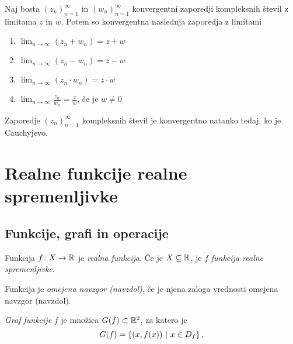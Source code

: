 \documentclass[12pt, a4paper]{article}
\begin{document}
\obvs

\begin{posledica}
Naj bosta $(z_n)_{n=1}^\infty$ in $(w_n)_{n=1}^\infty$ konvergentni zaporedji kompleksnih števil z limitama $z$ in $w$. Potem so konvergentna naslednja zaporedja z limitami

\begin{enumerate}[label=\arabic*)]
\item $\displaystyle\lim_{n\to\infty}(z_n+w_n)=z+w$
\item $\displaystyle\lim_{n\to\infty}(z_n-w_n)=z-w$
\item $\displaystyle\lim_{n\to\infty}(z_n\cdot w_n)=z\cdot w$
\item $\displaystyle\lim_{n\to\infty}\frac{z_n}{w_n}=\frac{z}{w}$, če je $w\ne 0$
\end{enumerate}
\end{posledica}

\begin{izrek}
Zaporedje $(z_n)_{n=1}^\infty$ kompleksnih števil je konvergentno natanko tedaj, ko je Cauchyjevo.
\end{izrek}

\obvs

\newpage

\section{Realne funkcije realne spremenljivke}

\subsection{Funkcije, grafi in operacije}

\begin{okvir}
\begin{definicija}
Funkcija $f\colon X\to\mathbb{R}$ je \emph{realna funkcija}. Če je $X\subseteq\mathbb{R}$, je $f$ \emph{funkcija realne spremenljivke}.
\end{definicija}
\end{okvir}

\begin{definicija}
Funkcija je \emph{omejena navzgor (navzdol)}, če je njena zaloga vrednosti omejena navzgor (navzdol).
\end{definicija}

\begin{definicija}
\emph{Graf funkcije} $f$ je množica $G(f)\subset\mathbb{R}^2$, za katero je
\[
G(f)=\left\{(x,f(x))~\middle\vert~x\in D_f\right\}.
\]
\end{definicija}
\end{document}
